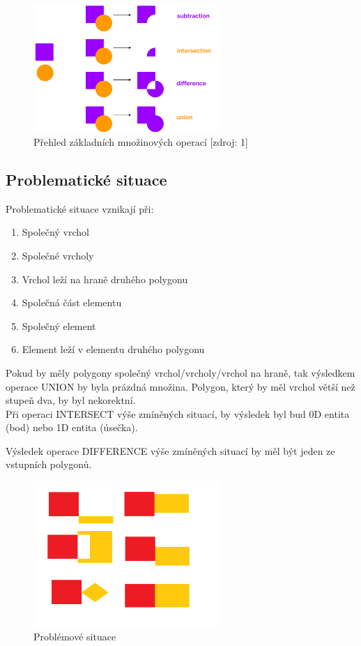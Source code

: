 \documentclass[a4paper, 12pt]{article}
\begin{document}
\begin{figure}[h!]
	\centering
	\includegraphics[width=7cm]{pictures/operace.png}
	\caption{Přehled základních množinových operací [zdroj: 1]}
\end{figure}

\subsection{Problematické situace}
Problematické situace vznikají při:

\begin{enumerate}
\item Společný vrchol
\item Společné vrcholy
\item Vrchol leží na hraně druhého polygonu
\item Společná část elementu
\item Společný element
\item Element leží v elementu druhého polygonu
\end{enumerate}

Pokud by měly polygony společný vrchol/vrcholy/vrchol na hraně, tak výsledkem operace UNION by byla prázdná množina. Polygon, který by měl vrchol větší než stupeň dva, by byl nekorektní.\\

Při operaci INTERSECT výše zmíněných situací, by výsledek byl bud 0D entita (bod) nebo 1D entita (úsečka).

Výsledek operace DIFFERENCE výše zmíněných situací by měl být jeden ze vstupních polygonů.

\begin{figure}[h!]
	\centering
	\includegraphics[width=7cm]{pictures/problem.png}
	\caption{Problémové situace}
\end{figure}
\end{document}
